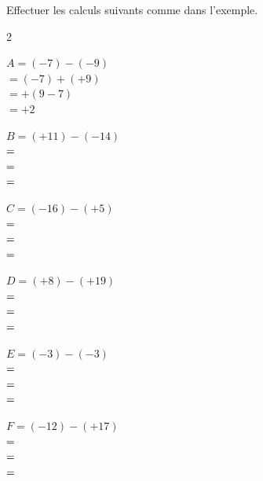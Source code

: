\documentclass[11pt]{article}
\begin{document}
\begin{exercice}[1]
Effectuer les calculs suivants comme dans l'exemple.

\begin{multicols}{2}

$A = (-7) - (-9)$\\
$= (-7) + (+9)$\\
$= +(9 - 7)$\\
$= +2$

\bigskip

$B = (+11) - (-14)$\\
$= \dotfill$\\
$= \dotfill$\\
$= \dotfill$

\bigskip

$C = (-16) - (+5)$\\
$= \dotfill$\\
$= \dotfill$\\
$= \dotfill$

\columnbreak

$D = (+8) - (+19)$\\
$= \dotfill$\\
$= \dotfill$\\
$= \dotfill$

\bigskip

$E = (-3) - (-3)$\\
$= \dotfill$\\
$= \dotfill$\\
$= \dotfill$

\bigskip

$F = (-12) - (+17)$\\
$= \dotfill$\\
$= \dotfill$\\
$= \dotfill$

\end{multicols}
\end{exercice}
\end{document}
